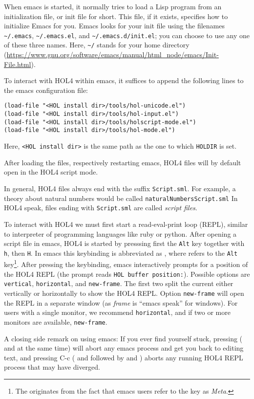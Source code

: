 When emacs is started, it normally tries to load a Lisp program from an
initialization file, or init file for short. This file, if it exists, specifies
how to initialize Emacs for you. Emacs looks for your init file using the
filenames \verb!~/.emacs!, \verb!~/.emacs.el!, and
\verb!~/.emacs.d/init.el!; you can choose to use any one of these three names.
Here, \verb!~/! stands for your home directory
(\url{https://www.gnu.org/software/emacs/manual/html_node/emacs/Init-File.html}).

To interact with HOL4 within emacs, it suffices to append the following lines to
the emacs configuration file:
\begin{lstlisting}
(load-file "<HOL install dir>/tools/hol-unicode.el")
(load-file "<HOL install dir>/tools/hol-input.el")
(load-file "<HOL install dir>/tools/holscript-mode.el")
(load-file "<HOL install dir>/tools/hol-mode.el")
\end{lstlisting}
\noindent Here, \lstinline{<HOL install dir>} is the same path as the one
to which \texttt{HOLDIR} is set.

After loading the files, respectively restarting emacs, HOL4 files will by
default open in the HOL4 script mode.

In general, HOL4 files always end with the suffix \texttt{Script.sml}.
For example, a theory about natural numbers would be called
\texttt{naturalNumbersScript.sml}
In HOL4 speak, files ending with \texttt{Script.sml} are called \emph{script files}.

To interact with HOL4 we must first start a read-eval-print loop (REPL), similar
to interpreter of programming languages like ruby or python.
After opening a script file in emacs, HOL4 is started by presssing
first the \texttt{Alt} key together with \texttt{h}, then \texttt{H}.
In emacs this keybinding is abbreviated as , where  refers
to the \texttt{Alt} key\footnote{The  originates from the fact that
  emacs users refer to the  key as \emph{Meta}.}.
After pressing the keybinding, emacs interactively prompts for a position of
the HOL4 REPL (the prompt reads \lstinline{HOL buffer position:}).
Possible options are \texttt{vertical}, \texttt{horizontal}, and
\texttt{new-frame}.
The first two split the current either vertically or horizontally to show the
HOL4 REPL.
Option \texttt{new-frame} will open the REPL in a separate window (as
\emph{frame} is ``emacs speak'' for windows).
For users with a single monitor, we recommend \texttt{horizontal}, and if two
or more monitors are available, \texttt{new-frame}.

A closing side remark on using emacs:
If you ever find yourself stuck, pressing  ( and
 at the same time) will abort any emacs process and get you back to
editing text, and pressing  {C-c} ( and  followed by
 and ) aborts any running HOL4 REPL process that may have
diverged.
